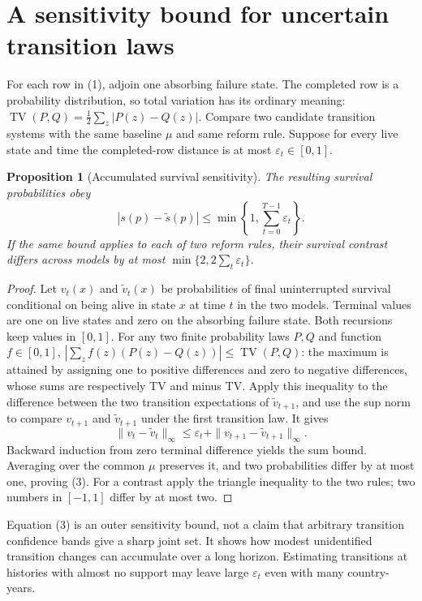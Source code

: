 \documentclass[11pt]{article}
\newtheorem{proposition}[theorem]{Proposition}
\begin{document}
\section{A sensitivity bound for uncertain transition laws}
For each row in (1), adjoin one absorbing failure state. The completed row
is a probability distribution, so total variation has its ordinary meaning:
$\operatorname{TV}(P,Q)=\frac12\sum_z|P(z)-Q(z)|$.
Compare two candidate transition systems with the same baseline $\mu$ and
same reform rule. Suppose for every live state and time the completed-row
distance is at most $\varepsilon_t\in[0,1]$.

\begin{proposition}[Accumulated survival sensitivity]\label{sensitivity}
The resulting survival probabilities obey
\[
 |s(p)-\widetilde s(p)|\leq
             \min\left\{1,\sum_{t=0}^{T-1}\varepsilon_t\right\}. \tag{3}
\]
If the same bound applies to each of two reform rules, their survival
contrast differs across models by at most
$\min\{2,2\sum_t\varepsilon_t\}$.
\end{proposition}
\begin{proof}
Let $v_t(x)$ and $\widetilde v_t(x)$ be probabilities of final uninterrupted
survival conditional on being alive in state $x$ at time $t$ in the two
models. Terminal values are one on live states and zero on the absorbing
failure state. Both recursions keep values in $[0,1]$.
For any two finite probability laws $P,Q$ and function $f\in[0,1]$,
$|\sum_zf(z)(P(z)-Q(z))|\leq\operatorname{TV}(P,Q)$:
the maximum is attained by assigning one to positive differences and
zero to negative differences, whose sums are respectively TV and minus TV.
Apply this inequality to the difference between the two transition
expectations of $\widetilde v_{t+1}$, and use the sup norm to compare
$v_{t+1}$ and $\widetilde v_{t+1}$ under the first transition law. It gives
\[
 \|v_t-\widetilde v_t\|_\infty
 \leq\varepsilon_t+\|v_{t+1}-\widetilde v_{t+1}\|_\infty.
\]
Backward induction from zero terminal difference yields the sum bound.
Averaging over the common $\mu$ preserves it, and two probabilities differ
by at most one, proving (3). For a contrast apply the triangle inequality
to the two rules; two numbers in $[-1,1]$ differ by at most two.
\end{proof}
Equation (3) is an outer sensitivity bound, not a claim that arbitrary
transition confidence bands give a sharp joint set. It shows how modest
unidentified transition changes can accumulate over a long horizon.
Estimating transitions at histories with almost no support may leave large
$\varepsilon_t$ even with many country-years.
\end{document}
